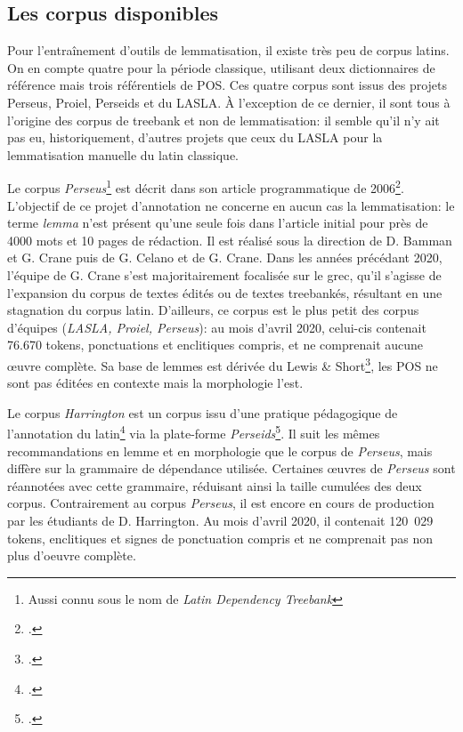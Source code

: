 \subsection{Les corpus disponibles}

Pour l'entraînement d'outils de lemmatisation, il existe très peu de corpus latins. On en compte quatre pour la période classique, utilisant deux dictionnaires de référence mais trois référentiels de POS. Ces quatre corpus sont issus des projets Perseus, Proiel, Perseids et du LASLA. À l'exception de ce dernier, il sont tous à l'origine des corpus de treebank et non de lemmatisation: il semble qu'il n'y ait pas eu, historiquement, d'autres projets que ceux du LASLA pour la lemmatisation manuelle du latin classique.

Le corpus \textit{Perseus}\footnote{Aussi connu sous le nom de \textit{Latin Dependency Treebank}} est décrit dans son article programmatique de 2006\footcite{bamman_design_2006}. L'objectif de ce projet d'annotation ne concerne en aucun cas la lemmatisation: le terme \textit{lemma} n'est présent qu'une seule fois dans l'article initial pour près de 4000 mots et 10 pages de rédaction. Il est réalisé sous la direction de D. Bamman et G. Crane puis de G. Celano et de G. Crane. Dans les années précédant 2020, l'équipe de G. Crane s'est majoritairement focalisée sur le grec, qu'il s'agisse de l'expansion du corpus de textes édités ou de textes treebankés, résultant en une stagnation du corpus latin. D'ailleurs, ce corpus est le plus petit des corpus d'équipes (\textit{LASLA, Proiel, Perseus}): au mois d'avril 2020, celui-cis contenait 76.670 tokens, ponctuations et enclitiques compris, et ne comprenait aucune œuvre complète. Sa base de lemmes est dérivée du Lewis \& Short\footcite{shorts_latin_1958}, les POS ne sont pas éditées en contexte mais la morphologie l'est.

Le corpus \textit{Harrington} est un corpus issu d'une pratique pédagogique de l'annotation du latin\footcite{noauthor_harrington_nodate} via la plate-forme \textit{Perseids}\footcite{almas_perseids_2016}. Il suit les mêmes recommandations en lemme et en morphologie que le corpus de \textit{Perseus}, mais diffère sur la grammaire de dépendance utilisée. Certaines œuvres de \textit{Perseus} sont réannotées avec cette grammaire, réduisant ainsi la taille cumulées des deux corpus. Contrairement au corpus \textit{Perseus}, il est encore en cours de production par les étudiants de D. Harrington. Au mois d'avril 2020, il contenait 120~029 tokens, enclitiques et signes de ponctuation compris et ne comprenait pas non plus d'oeuvre complète. 


